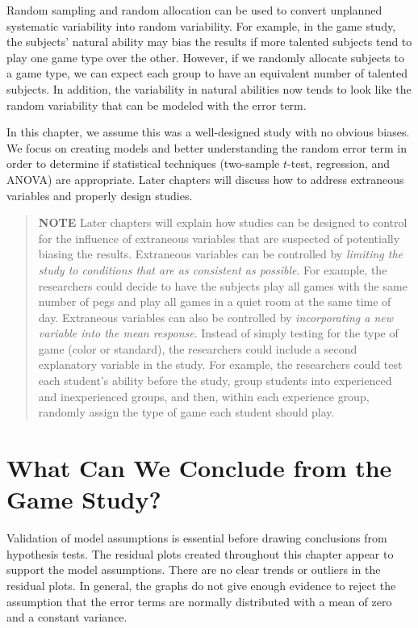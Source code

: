 \documentclass[
]{book}
\begin{document}
Random sampling and random allocation can be used to convert unplanned systematic variability into random variability. For example, in the game study, the subjects' natural ability may bias the results if more talented subjects tend to play one game type over the other. However, if we randomly allocate subjects to a game type, we can expect each group to have an equivalent number of talented subjects. In addition, the variability in natural abilities now tends to look like the random variability that can be modeled with the error term.

In this chapter, we assume this was a well-designed study with no obvious biases. We focus on creating models and better understanding the random error term in order to determine if statistical techniques (two-sample \(t\)-test, regression, and ANOVA) are appropriate. Later chapters will discuss how to address extraneous variables and properly design studies.

\begin{quote}
\textbf{NOTE}
Later chapters will explain how studies can be designed to control for the influence of extraneous variables that are suspected of potentially biasing the results. Extraneous variables can be controlled by \emph{limiting the study to conditions that are as consistent as possible}. For example, the researchers could decide to have the subjects play all games with the same number of pegs and play all games in a quiet room at the same time of day. Extraneous variables can also be controlled by \emph{incorporating a new variable into the mean response}. Instead of simply testing for the type of game (color or standard), the researchers could include a second explanatory variable in the study. For example, the researchers could test each student's ability before the study, group students into experienced and inexperienced groups, and then, within each experience group, randomly assign the type of game each student should play.
\end{quote}

\hypertarget{what-can-we-conclude-from-the-game-study}{%
\section{What Can We Conclude from the Game Study?}\label{what-can-we-conclude-from-the-game-study}}

Validation of model assumptions is essential before drawing conclusions from hypothesis tests. The residual plots created throughout this chapter appear to support the model assumptions. There are no clear trends or outliers in the residual plots. In general, the graphs do not give enough evidence to reject the assumption that the error terms are normally distributed with a mean of zero and a constant variance.
\end{document}
